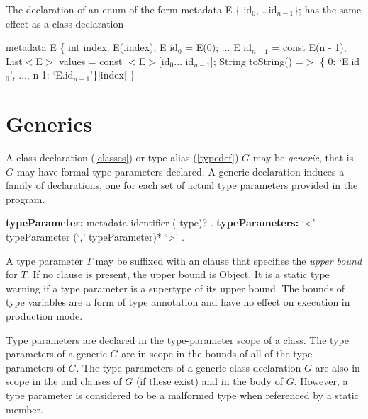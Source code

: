 \documentclass{article}
\newcommand{\code}[1]{{\sf #1}}
\begin{document}
\LMHash{}
The declaration of an enum of the form \code{metadata \ENUM{} E \{ id$_0$, \ldots id$_{n-1}$\};}
has the same effect as a class declaration

\begin{dartCode}
metadata \CLASS{} E \{
  \FINAL{} int index;
  \CONST{} E(\THIS{}.index);
  \STATIC{} \CONST{} E id$_0$ = \CONST{} E(0);
  $\ldots$
  \STATIC{} \CONST{} E id$_{n-1}$ = const E(n - 1);
  \STATIC{} \CONST{} List$<$E$>$ values = const $<$E$>$[id$_0 \ldots $ id$_{n-1}$];
  String toString() =$>$ \{ 0: `E.id$_0$', $\ldots$, n-1: `E.id$_{n-1}$'\}[index]
\}
\end{dartCode}


\section{Generics}

\LMHash{}
A class declaration (\ref{classes}) or type alias (\ref{typedef}) 
$G$ may be {\em generic}, that is, $G$ may have formal type parameters declared. A generic declaration induces a family of declarations, one for each set of actual type parameters provided in the program. 

\begin{grammar}
{\bf typeParameter:}
     metadata identifier (\EXTENDS{} type)?
    .
{\bf typeParameters:}
     `<' typeParameter (`,' typeParameter)* `>'
    .
\end{grammar}

\LMHash{}
A type parameter $T$ may be suffixed with an \EXTENDS{} clause that specifies the {\em upper bound} for $T$. If no  \EXTENDS{} clause is present, the upper bound is \code{Object}.  It is a static type warning if a type parameter is a supertype of its upper bound. The bounds of type variables are a form of type annotation and have no effect on execution in production mode.

\LMHash{}
Type parameters are declared in the type-parameter scope of a class.
The type parameters of a generic $G$ are in scope in the bounds of all of the type parameters of $G$. The type parameters of a generic class declaration $G$ are also in scope in the \EXTENDS{} and \IMPLEMENTS{} clauses of $G$ (if these exist) and in the body of $G$.   However, a type parameter is considered to be a malformed type when referenced by a static member.
\end{document}
